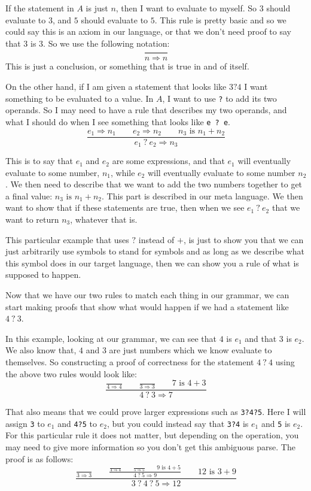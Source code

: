 \documentclass[main.tex]{subfiles}
\begin{document}
If the statement in $A$ is just $n$, then I want to evaluate to myself. So $3$ should evaluate to $3$, and $5$ should evaluate to $5$. This rule is pretty basic and so we could say this is an axiom in our language, or that we don't need proof to say that $3$ is $3$. So we use the following notation:
$$\frac{}{n \Rightarrow n}$$
This is just a conclusion, or something that is true in and of itself. 

On the other hand, if I am given a statement that looks like $ 3 ? 4$ I want something to be evaluated to a value. In $A$, I want to use \texttt{?} to add its two operands. So I may need to have a rule that describes my two operands, and what I should do when I see something that looks like \texttt{e ? e}. 
$$\frac{e_1 \Rightarrow n_1 \qquad e_2 \Rightarrow n_2 \qquad n_3 \text{ is } n_1 + n_2}{e_1\ ?\ e_2 \Rightarrow n_3}$$

This is to say that $e_1$ and $e_2$ are some expressions, and that $e_1$ will eventually evaluate to some number, $n_1$, while $e_2$ will eventually evaluate to some number $n_2$. We then need to describe that we want to add the two numbers together to get a final value: $n_3 \text{ is } n_1 + n_ 2$. This part is described in our meta language. We then want to show that if these statements are true, then when we see $e_1\ ?\ e_2$ that we want to return $n_3$, whatever that is. 

This particular example that uses $?$ instead of $+$, is just to show you that we can just arbitrarily use symbols to stand for symbols and as long as we describe what this symbol does in our target language, then we can show you a rule of what is supposed to happen. 

Now that we have our two rules to match each thing in our grammar, we can start making proofs that show what would happen if we had a statement like $4\ ?\ 3$. 

In this example, looking at our grammar, we can see that $4$ is $e_1$ and that $3$ is $e_2$. We also know that, $4$ and $3$ are just numbers which we know evaluate to themselves. So constructing a proof of correctness for the statement $4\ ?\ 4$ using the above two rules would look like:
$$\frac{\frac{}{4 \Rightarrow 4} \qquad \frac{}{3 \Rightarrow 3}\qquad 7 \text{ is } 4 + 3}{4\ ?\ 3 \Rightarrow 7}$$

That also means that we could prove larger expressions such as \texttt{3?4?5}. Here I will assign \texttt{3} to $e_1$ and \texttt{4?5} to $e_2$, but you could instead say that \texttt{3?4} is $e_1$ and \texttt{5} is $e_2$. For this particular rule it does not matter, but depending on the operation, you may need to give more information so you don't get this ambiguous parse. The proof is as follows:
$$\frac{\frac{}{3 \Rightarrow 3} \qquad \frac{\frac{}{4\Rightarrow 4}\qquad \frac{}{5\Rightarrow 5} \qquad 9 \text{ is } 4 + 5}{4\ ?\ 5 \Rightarrow 9}\qquad 12 \text{ is } 3 + 9}{3\ ?\ 4\ ?\ 5\Rightarrow 12}$$
\end{document}
